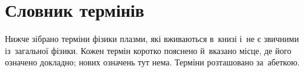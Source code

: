 

\chapter*{Словник термінів}\label{sec:glossary}\hypertarget{glossary}{}

Нижче зібрано терміни фізики плазми, які вживаються в~книзі
і~не є звичними із~загальної фізики. Кожен термін коротко пояснено й~вказано місце, де його означено докладно;
нових означень тут нема. Терміни розташовано за~абеткою.

\makeatletter\edef\glosssavedbpp{\the\@beginparpenalty}\makeatother
\newcommand{\glossletterfirst}[1]{\glossbadge{#1}\begin{itemize}[topsep=0pt]}
\newcommand{\glossletter}[1]{\end{itemize}\glossbadge{#1}\begin{itemize}[topsep=0pt]}

